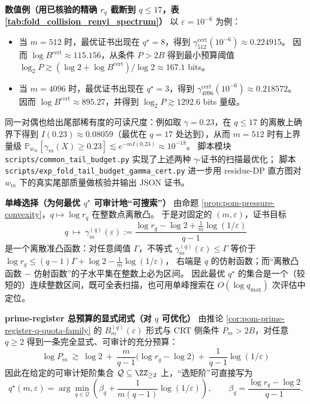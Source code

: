 \begin{remark}
\medskip\noindent\textbf{数值例（用已核验的精确 \texorpdfstring{$r_q$}{rq} 截断到 \(q\le 17\)，表 \ref{tab:fold_collision_renyi_spectrum}）}
以 \(\varepsilon=10^{-6}\) 为例：
\begin{itemize}
  \item 当 \(m=512\) 时，最优证书出现在 \(q^\star=8\)，得到 \(\gamma^{\mathrm{cert}}_{512}(10^{-6})\approx 0.224915\)。
  因而 \(\log B^{\mathrm{cert}}\approx 115.156\)，从条件 \(P>2B\) 得到最小预算阈值
  \(\log_2 P\gtrsim (\log 2+\log B^{\mathrm{cert}})/\log 2\approx 167.1\) bits。
  \item 当 \(m=4096\) 时，最优证书出现在 \(q^\star=3\)，得到 \(\gamma^{\mathrm{cert}}_{4096}(10^{-6})\approx 0.218572\)。
  因而 \(\log B^{\mathrm{cert}}\approx 895.27\)，并得到 \(\log_2 P\gtrsim 1292.6\) bits 量级。
\end{itemize}
同一对偶也给出尾部稀有度的可读尺度：例如取 \(\gamma=0.23\)，在 \(q\le 17\) 的离散上确界下得到
\(I(0.23)\approx 0.08059\)（最优在 \(q=17\) 处达到），从而 \(m=512\) 时有上界量级
\(\mathbb{P}_{w_m}[\gamma_m(X)\ge 0.23]\lesssim e^{-m I(0.23)}\approx 10^{-18}\)。
脚本模块 \texttt{scripts/common\_tail\_budget.py} 实现了上述两种 \(\gamma\)-证书的扫描最优化；
脚本 \texttt{scripts/exp\_fold\_tail\_budget\_gamma\_cert.py} 进一步用 residue-DP 直方图对 \(w_m\) 下的真实尾部质量做核验并输出 JSON 证书。
\par
\medskip\noindent\textbf{单峰选择（为何最优 \(q^\star\) 可审计地“可搜索”）}
由命题 \ref{prop:pom-pressure-convexity}，\(q\mapsto \log r_q\) 在整数点离散凸。
于是对固定的 \((m,\varepsilon)\)，证书目标
\[
q\ \longmapsto\ \gamma^{(q)}_{m}(\varepsilon)
:=\frac{\log r_q-\log 2+\frac{1}{m}\log(1/\varepsilon)}{q-1}
\]
是一个离散准凸函数：对任意阈值 \(\Gamma\)，不等式 \(\gamma^{(q)}_m(\varepsilon)\le \Gamma\) 等价于
\(
\log r_q \le (q-1)\Gamma+\log 2-\frac{1}{m}\log(1/\varepsilon)
\)，
右端是 \(q\) 的仿射函数；而“离散凸函数 \(-\) 仿射函数”的子水平集在整数上必为区间。
因此最优 \(q^\star\) 的集合是一个（较短的）连续整数区间，既可全表扫描，也可用单峰搜索在 \(O(\log q_{\max})\) 次评估中定位。

\medskip\noindent\textbf{prime-register 总预算的显式闭式（对 \(q\) 可优化）}
由推论 \ref{cor:pom-prime-register-q-quota-family} 的 \(B_m^{(q)}(\varepsilon)\) 形式与 CRT 侧条件 \(P_m>2B\)，对任意 \(q\ge 2\) 得到一条完全显式、可审计的充分预算：
\[
\boxed{\;
\log P_m\ \gtrsim\ \log 2\ +\ \frac{m}{q-1}\bigl(\log r_q-\log 2\bigr)\ +\ \frac{1}{q-1}\log(1/\varepsilon)\;}
\]
因此在给定的可审计矩阶集合 \(\mathcal{Q}\subseteq\ZZ_{\ge 2}\) 上，“选矩阶”可直接写为
\[
q^\star(m,\varepsilon)=\arg\min_{q\in\mathcal{Q}}\left(\beta_q+\frac{1}{m(q-1)}\log(1/\varepsilon)\right),
\qquad
\beta_q=\frac{\log r_q-\log 2}{q-1}.
\]


\end{remark}
